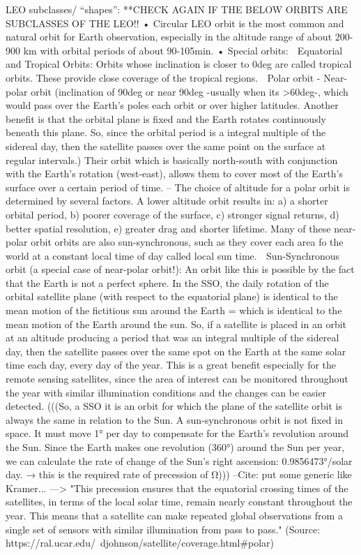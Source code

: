 LEO subclasses/ “shapes”:
**CHECK AGAIN IF THE BELOW ORBITS ARE SUBCLASSES OF THE LEO!!
•	Circular LEO orbit is the most common and natural orbit for Earth observation, especially in the altitude range of about 200-900 km with orbital periods of about 90-105min.
•	Special orbits:
   Equatorial and Tropical Orbits: Orbits whose inclination is closer to 0deg are called tropical orbits. These provide close coverage of the tropical regions.
	Polar orbit - Near-polar orbit (inclination of 90deg or near 90deg -usually when its >60deg-, which would pass over the Earth's poles each orbit or over higher latitudes. Another benefit is that the orbital plane is fixed and the Earth rotates continuously beneath this plane. So, since the orbital period is a integral multiple of the sidereal day, then the satellite passes over the same point on the surface at regular intervals.) Their orbit which is basically north-south with conjunction with the Earth's rotation (west-east), allows them to cover most of the Earth's surface over a certain period of time.
-- The choice of altitude for a polar orbit is determined by several factors. A lower altitude orbit results in: a) a shorter orbital period, b) poorer coverage of the surface, c) stronger signal returns, d) better spatial resolution, e) greater drag and shorter lifetime.
Many of these near-polar orbit orbits are also sun-synchronous, such as they cover each area fo the world at a constant local time of day called local sun time.
	Sun-Synchronous orbit (a special case of near-polar orbit!):
An orbit like this is possible by the fact that the Earth is not a perfect sphere. In the SSO, the daily rotation of the orbital satellite plane (with respect to the equatorial plane) is identical to the mean motion of the fictitious sun around the Earth = which is identical to the mean motion of the Earth around the sun. So, if a satellite is placed in an orbit at an altitude producing a period that was an integral multiple of the sidereal day, then the satellite passes over the same spot on the Earth at the same solar time each day, every day of the year. This is a great benefit especially for the remote sensing satellites, since the area of interest can be monitored throughout the year with similar illumination conditions and the changes can be easier detected.
(((So, a SSO it is an orbit for which the plane of the satellite orbit is always the same in relation to the Sun. A sun-synchronous orbit is not fixed in space. It must move 1° per day to compensate for the Earth's revolution around the Sun. Since the Earth makes one revolution (360°) around the Sun per year, we can calculate the rate of change of the Sun's right ascension: 0.9856473°/solar day. → this is the required rate of precession of Ω))) --Cite: put some generic like Kramer... --->  "This precession ensures that the equatorial crossing times of the satellites, in terms of the local solar time, remain nearly constant throughout the year. This means that a satellite can make repeated global observations from a single set of sensors with similar illumination from pass to pass." (Source: https://ral.ucar.edu/~djohnson/satellite/coverage.html#polar)
